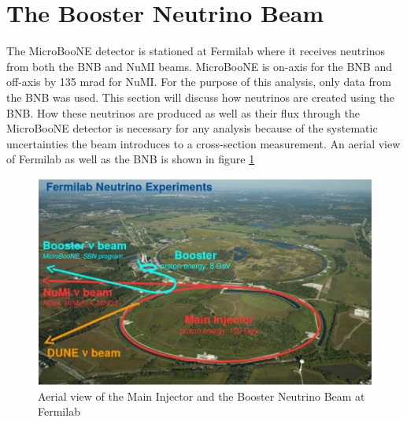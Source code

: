 \section{The Booster Neutrino Beam}
The MicroBooNE detector is stationed at Fermilab where it receives neutrinos from both the BNB and NuMI beams. MicroBooNE is on-axis for the BNB and off-axis by 135 mrad for NuMI. For the purpose of this analysis, only data from the BNB was used. This section will discuss how neutrinos are created using the BNB. How these neutrinos are produced as well as their flux through the MicroBooNE detector is necessary for any analysis because of the systematic uncertainties the beam introduces to a cross-section measurement. An aerial view of Fermilab as well as the BNB is shown in figure \ref{fig:fnal}

\begin{figure}[htp!]
\centering
\includegraphics[width=\textwidth]{figs/fnal.png}
\caption{Aerial view of the Main Injector and the Booster Neutrino Beam at Fermilab}
\label{fig:fnal}
\end{figure}

